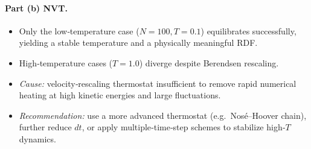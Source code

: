 \documentclass[11pt]{article}
\begin{document}
\paragraph{Part (b) NVT.}
\begin{itemize}
  \item Only the low‐temperature case ($N=100,T=0.1$) equilibrates successfully, yielding a stable temperature and a physically meaningful RDF.  
  \item High‐temperature cases ($T=1.0$) diverge despite Berendsen rescaling.  
  \item \emph{Cause:} velocity‐rescaling thermostat insufficient to remove rapid numerical heating at high kinetic energies and large fluctuations.  
  \item \emph{Recommendation:} use a more advanced thermostat (e.g.\ Nosé–Hoover chain), further reduce $dt$, or apply multiple‐time‐step schemes to stabilize high‐$T$ dynamics.
\end{itemize}
\end{document}
